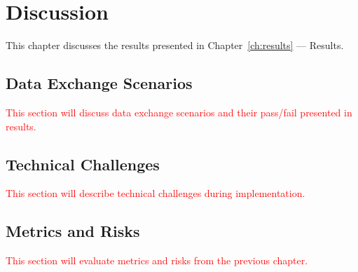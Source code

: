 \chapter{Discussion}\label{ch:discussion}

\begin{chapterabstract}
    This chapter discusses the results presented in Chapter~\ref{ch:results} --- Results.
\end{chapterabstract}

\section{Data Exchange Scenarios}\label{sec:data-exchange-scenarios-evaluation}

\textcolor{red}{This section will discuss data exchange scenarios and their pass/fail presented in results.}

\section{Technical Challenges}\label{sec:technical-challenges}

\textcolor{red}{This section will describe technical challenges during implementation.}

\section{Metrics and Risks}\label{sec:metrics-and-risks-evaluation}

\textcolor{red}{This section will evaluate metrics and risks from the previous chapter.}
